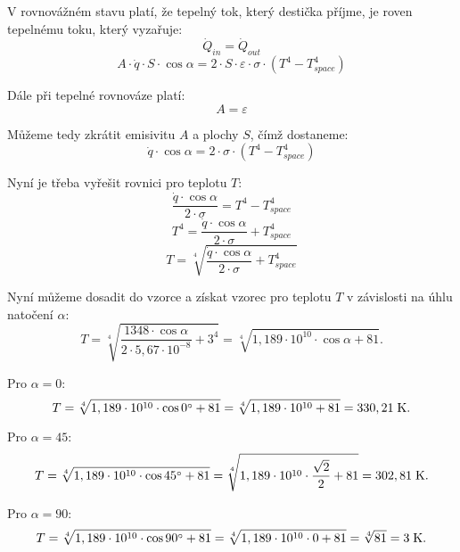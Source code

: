 \documentclass{article}
\begin{document}
V rovnovážném stavu platí, že tepelný tok, který destička příjme, je roven tepelnému toku, který vyzařuje:
$$
    \dot{Q}_{in} = \dot{Q}_{out}
$$
$$
    A \cdot \dot{q} \cdot S \cdot \cos \alpha = 2 \cdot S \cdot \varepsilon \cdot \sigma \cdot \left( T^4 - T_{space}^4 \right)
$$

Dále při tepelné rovnováze platí:
$$
    A = \varepsilon
$$

Můžeme tedy zkrátit emisivitu $A$ a plochy $S$, čímž dostaneme:
$$
    \dot{q} \cdot \cos \alpha = 2 \cdot \sigma \cdot \left( T^4 - T_{space}^4 \right)
$$

Nyní je třeba vyřešit rovnici pro teplotu $T$:
$$
    \frac{\dot{q} \cdot \cos \alpha}{2 \cdot \sigma} = T^4 - T_{space}^4
$$
$$
    T^4 = \frac{\dot{q} \cdot \cos \alpha}{2 \cdot \sigma} + T_{space}^4
$$
$$
    T = \sqrt[4]{\frac{\dot{q} \cdot \cos \alpha}{2 \cdot \sigma} + T_{space}^4}
$$

Nyní můžeme dosadit do vzorce a získat vzorec pro teplotu $T$ v závislosti na úhlu natočení $\alpha$:
$$
    T = \sqrt[4]{\frac{1348 \cdot \cos \alpha}{2 \cdot 5,67 \cdot 10^{-8}} + 3^4} = \sqrt[4]{1,189 \cdot 10^{10} \cdot \cos \alpha + 81}.
$$

Pro $\alpha = 0$:
$$
    T = \sqrt[4]{1,189 \cdot 10^{10} \cdot \cos 0 ^\circ + 81} = \sqrt[4]{1,189 \cdot 10^{10} + 81} = 330,21 \; \textrm{K}.
$$

Pro $\alpha = 45$:
$$
    T = \sqrt[4]{1,189 \cdot 10^{10} \cdot \cos 45 ^\circ + 81} = \sqrt[4]{1,189 \cdot 10^{10} \cdot \frac{\sqrt{2}}{2} + 81} = 302,81 \; \textrm{K}.
$$

Pro $\alpha = 90$:
$$
    T = \sqrt[4]{1,189 \cdot 10^{10} \cdot \cos 90 ^\circ + 81} = \sqrt[4]{1,189 \cdot 10^{10} \cdot 0 + 81} = \sqrt[4]{81} = 3 \; \textrm{K}.
$$
\end{document}
